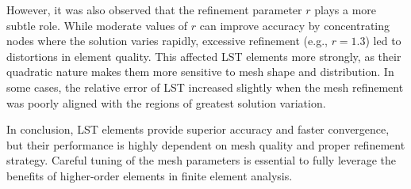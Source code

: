 \documentclass[12pt]{article}
\begin{document}
However, it was also observed that the refinement parameter $r$ plays a more subtle role. While moderate values of $r$ can improve accuracy by concentrating nodes where the solution varies rapidly, excessive refinement (e.g., $r = 1.3$) led to distortions in element quality. This affected LST elements more strongly, as their quadratic nature makes them more sensitive to mesh shape and distribution. In some cases, the relative error of LST increased slightly when the mesh refinement was poorly aligned with the regions of greatest solution variation.

In conclusion, LST elements provide superior accuracy and faster convergence, but their performance is highly dependent on mesh quality and proper refinement strategy. Careful tuning of the mesh parameters is essential to fully leverage the benefits of higher-order elements in finite element analysis.
\end{document}
